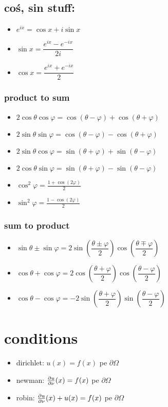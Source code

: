 \documentclass[11pt]{article}
\begin{document}
\subsection*{coś, sin stuff:}
\label{sec:org2cf6738}
\begin{itemize}
\item \(e^{ix} = \cos x + i \sin x\)
\item \(\sin x = \dfrac{e^{ix}-e^{-ix}}{2i}\)
\item \(\cos x = \dfrac{e^{ix}+e^{-ix}}{2}\)
\end{itemize}
\subsubsection*{product to sum}
\label{sec:org80438fc}
\begin{itemize}
\item \(2\cos \theta \cos \varphi = {{\cos(\theta - \varphi) + \cos(\theta + \varphi)}}\)
\item \(2\sin \theta \sin \varphi = {{\cos(\theta - \varphi) - \cos(\theta + \varphi)} }\)
\item \(2\sin \theta \cos \varphi = {{\sin(\theta + \varphi) + \sin(\theta - \varphi)} }\)
\item \(2\cos \theta \sin \varphi = {{\sin(\theta + \varphi) - \sin(\theta - \varphi)} }\)
\item \(\cos^2 \varphi = \frac{1+\cos(2\varphi)}{2}\)
\item \(\sin^2 \varphi = \frac{1-\cos(2\varphi)}{2}\)
\end{itemize}

\subsubsection*{sum to product}
\label{sec:org4d0e6db}
\begin{itemize}
\item \(\sin \theta \pm \sin \varphi = 2 \sin\left( \dfrac{\theta \pm \varphi}{2} \right) \cos\left( \dfrac{\theta \mp \varphi}{2} \right)\)
\item \(\cos \theta + \cos \varphi = 2 \cos\left( \dfrac{\theta + \varphi} {2} \right) \cos\left( \dfrac{\theta - \varphi}{2} \right)\)
\item \(\cos \theta - \cos \varphi = -2\sin\left( \dfrac{\theta + \varphi}{2}\right) \sin\left(\dfrac{\theta - \varphi}{2}\right)\)
\end{itemize}


\section*{conditions}
\label{sec:orge679b78}
\begin{itemize}
\item dirichlet: \(u(x) = f(x)\) pe \(\partial \Omega\)
\item newman: \(\frac{\partial u}{\partial \nu}(x) = f(x)\) pe \(\partial \Omega\)
\item robin: \(\frac{\partial u}{\partial \nu}(x) +u(x) = f(x)\) pe \(\partial \Omega\)
\end{itemize}
\end{document}
